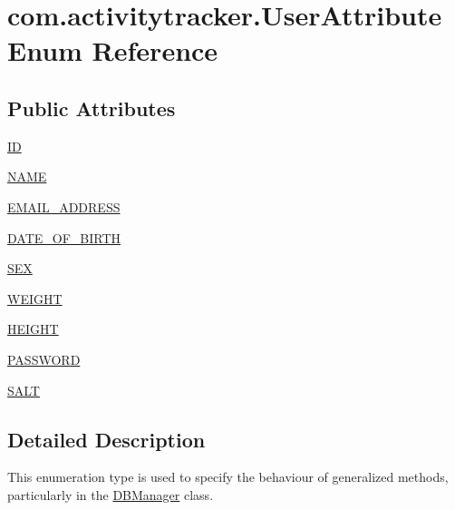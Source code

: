 \hypertarget{enumcom_1_1activitytracker_1_1_user_attribute}{}\section{com.\+activitytracker.\+User\+Attribute Enum Reference}
\label{enumcom_1_1activitytracker_1_1_user_attribute}
\subsection*{Public Attributes}
\begin{DoxyCompactItemize}
\item 
\mbox{\hyperlink{enumcom_1_1activitytracker_1_1_user_attribute_a82c5680d15b629e939afcd98a39abf76}{ID}}
\item 
\mbox{\hyperlink{enumcom_1_1activitytracker_1_1_user_attribute_aac51a5dfcaaa9e5304d37d74fc888af4}{N\+A\+ME}}
\item 
\mbox{\hyperlink{enumcom_1_1activitytracker_1_1_user_attribute_a8b9fa2ebf911262dfa24c683ff2a3b9c}{E\+M\+A\+I\+L\+\_\+\+A\+D\+D\+R\+E\+SS}}
\item 
\mbox{\hyperlink{enumcom_1_1activitytracker_1_1_user_attribute_af3b77ceae76c5f1c46e6821dc98940ee}{D\+A\+T\+E\+\_\+\+O\+F\+\_\+\+B\+I\+R\+TH}}
\item 
\mbox{\hyperlink{enumcom_1_1activitytracker_1_1_user_attribute_a53fe928fb805b69c606a351aac257558}{S\+EX}}
\item 
\mbox{\hyperlink{enumcom_1_1activitytracker_1_1_user_attribute_a024206b0dc3261031ef586b3f0fd530c}{W\+E\+I\+G\+HT}}
\item 
\mbox{\hyperlink{enumcom_1_1activitytracker_1_1_user_attribute_a0a80ca5cce8eb4494c2128bd4291a5b7}{H\+E\+I\+G\+HT}}
\item 
\mbox{\hyperlink{enumcom_1_1activitytracker_1_1_user_attribute_aa893eac0362a28e73a599ce1ba141d40}{P\+A\+S\+S\+W\+O\+RD}}
\item 
\mbox{\hyperlink{enumcom_1_1activitytracker_1_1_user_attribute_acd286be9d131a84a2be02e1cdac4c848}{S\+A\+LT}}
\end{DoxyCompactItemize}


\subsection{Detailed Description}
This enumeration type is used to specify the behaviour of generalized methods, particularly in the \mbox{\hyperlink{classcom_1_1activitytracker_1_1_d_b_manager}{D\+B\+Manager}} class. 

